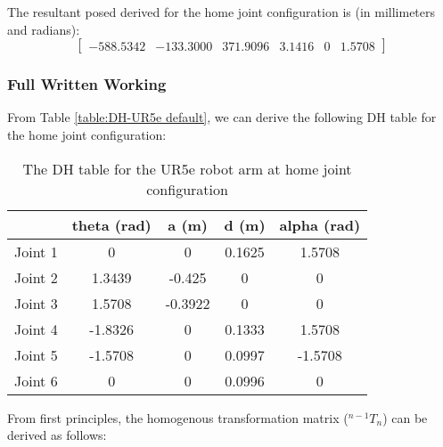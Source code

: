 The resultant posed derived for the home joint configuration is (in millimeters and radians):
\begin{equation*}
    \begin{bmatrix}
        -588.5342 & -133.3000 & 371.9096 & 3.1416 & 0 & 1.5708
    \end{bmatrix}
\end{equation*}
\subsubsection{Full Written Working}

From Table \ref{table:DH-UR5e default}, we can derive the following DH table for the home joint configuration:

\begin{table}[H]
    \centering
    \begin{tabular}{|c|c|c|c|c|}
        \hline
                & \textbf{theta (rad)} & \textbf{a (m)} & \textbf{d (m)} & \textbf{alpha (rad)} \\ \hline
        Joint 1 & 0                    & 0              & 0.1625         & 1.5708               \\ \hline
        Joint 2 & 1.3439               & -0.425         & 0              & 0                    \\ \hline
        Joint 3 & 1.5708               & -0.3922        & 0              & 0                    \\ \hline
        Joint 4 & -1.8326              & 0              & 0.1333         & 1.5708               \\ \hline
        Joint 5 & -1.5708              & 0              & 0.0997         & -1.5708              \\ \hline
        Joint 6 & 0                    & 0              & 0.0996         & 0                    \\ \hline
    \end{tabular}
    \caption{The DH table for the UR5e robot arm at home joint configuration}
    \label{table:DH-UR5e home}
\end{table}


From first principles, the homogenous transformation matrix ($^{n-1}T_{n}$) can be derived as follows:

